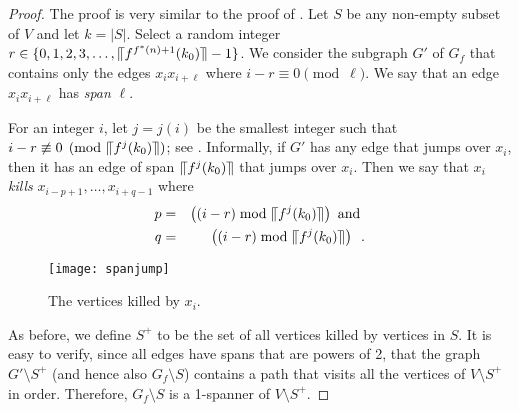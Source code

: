 \documentclass{sig-alternate}
\makeatletter
\newcommand{\upen}[1]{\llceil#1\rrceil}
\def\ScaleIfNeeded{%
\ifdim\Gin@nat@width>.97\linewidth
.97\linewidth
\else
\Gin@nat@width
\fi
}
\makeatother
\begin{document}
\begin{proof}
  The proof is very similar to the proof of .  Let $S$ be
  any non-empty subset of $V$ and let $k=|S|$.   Select a random integer
  $r\in\{0,1,2,3,\ldots,\upen{f^{f^*(n)+1}(k_0)}-1\}$.  We consider the
  subgraph $G'$ of $G_f$ that contains only the edges $x_ix_{i+\ell}$
  where $i-r\equiv 0\pmod{\ell}$.  We say that an edge $x_ix_{i+\ell}$
  has \emph{span} $\ell$.

  For an integer $i$, let $j=j(i)$ be the smallest integer such that
  $i-r\not\equiv 0\pmod{\upen{f^j(k_0)}}$; see .
  Informally, if $G'$ has any edge that jumps over $x_i$, then it has an
  edge of span $\upen{f^j(k_0)}$ that jumps over $x_i$.  Then we say that
   $x_i$ \emph{kills} $x_{i-p+1},\ldots,x_{i+q-1}$ where
  \begin{eqnarray*}
     p&=& \left((i-r) \bmod \upen{f^j(k_0)}\right) \text{ and } \\
     q&=& \left((i-r) \bmod \upen{f^j(k_0)}\right) \enspace .
  \end{eqnarray*}
  \begin{figure}
    \begin{center}
      \texttt{[image: spanjump]}
    \end{center}
    \caption{The vertices killed by $x_i$.}
  \end{figure}
  As before, we define $S^+$ to be the set of all vertices killed by
  vertices in $S$.  It is easy to verify, since all edges have
  spans that are powers of 2, that the graph $G'\setminus S^+$ (and hence
  also $G_f\setminus S$) contains a path that visits all the vertices of
  $V\setminus S^+$ in order.  Therefore, $G_f\setminus S$ is a 1-spanner
  of $V\setminus S^+$.


\end{proof}
\end{document}
